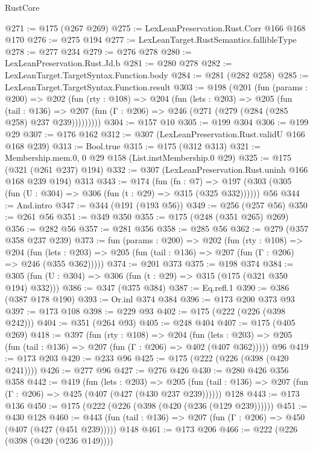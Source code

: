 \begin{lexlean}{RustCore}
\begin{coremodule}
@271 := @175 (@267 @269)
@275 := LexLeanPreservation.Rust.Corr @166 @168 @170
@276 := @275 @194
@277 := LexLeanTarget.RustSemantics.fallibleType
@278 := @277 @234
@279 := @276 @278
@280 := LexLeanPreservation.Rust.Jd.b
@281 := @280 @278
@282 := LexLeanTarget.TargetSyntax.Function.body
@284 := @281 (@282 @258)
@285 := LexLeanTarget.TargetSyntax.Function.result
@303 := @198
    (@201
      (fun (params : @200) =>
      @202
        (fun (rty : @108) =>
        @204
          (fun (lets : @203) =>
          @205
            (fun (tail : @136) =>
            @207 (fun (Γ : @206) => @246 (@271 (@279 (@284 (@285 @258) @237 @239)))))))))
@304 := @157 @10
@305 := @199 @304
@306 := @199 @29
@307 := @176 @162
@312 := @307 (LexLeanPreservation.Rust.validU @166 @168 @239)
@313 := Bool.true
@315 := @175 (@312 @313)
@321 := Membership.mem.{0, 0} @29 @158 (List.instMembership.{0} @29)
@325 := @175 (@321 (@261 @237) @194)
@332 := @307 (LexLeanPreservation.Rust.uninh @166 @168 @239 @194) @313
@343 := @174
    (fun (fn : @7) =>
    @197 (@303 (@305 (fun (U : @304) => @306 (fun (t : @29) => @315 (@325 @332))))))
    @56
@344 := And.intro
@347 := @344 (@191 (@193 @56))
@349 := @256 (@257 @56)
@350 := @261 @56
@351 := @349 @350
@355 := @175 (@248 (@351 @265) @269)
@356 := @282 @56
@357 := @281 @356
@358 := @285 @56
@362 := @279 (@357 @358 @237 @239)
@373 := fun (params : @200) =>
  @202
    (fun (rty : @108) =>
    @204
      (fun (lets : @203) => @205 (fun (tail : @136) => @207 (fun (Γ : @206) => @246 (@355 @362)))))
@374 := @201 @373
@375 := @198 @374
@384 := @305 (fun (U : @304) => @306 (fun (t : @29) => @315 (@175 (@321 @350 @194) @332)))
@386 := @347 (@375 @384)
@387 := Eq.refl.{1}
@390 := @386 (@387 @178 @190)
@393 := Or.inl @374 @384
@396 := @173 @200 @373 @93
@397 := @173 @108
@398 := @229 @93
@402 := @175 (@222 (@226 (@398 @242)))
@404 := @351 (@264 @93)
@405 := @248 @404
@407 := @175 (@405 @269)
@418 := @397
    (fun (rty : @108) =>
    @204
      (fun (lets : @203) => @205 (fun (tail : @136) => @207 (fun (Γ : @206) => @402 (@407 @362)))))
    @96
@419 := @173 @203
@420 := @233 @96
@425 := @175 (@222 (@226 (@398 (@420 @241))))
@426 := @277 @96
@427 := @276 @426
@430 := @280 @426 @356 @358
@442 := @419
    (fun (lets : @203) =>
    @205 (fun (tail : @136) => @207 (fun (Γ : @206) => @425 (@407 (@427 (@430 @237 @239))))))
    @128
@443 := @173 @136
@450 := @175 (@222 (@226 (@398 (@420 (@236 (@129 @239))))))
@451 := @430 @128
@460 := @443 (fun (tail : @136) => @207 (fun (Γ : @206) => @450 (@407 (@427 (@451 @239))))) @148
@461 := @173 @206
@466 := @222 (@226 (@398 (@420 (@236 @149))))

\end{coremodule}
\end{lexlean}
